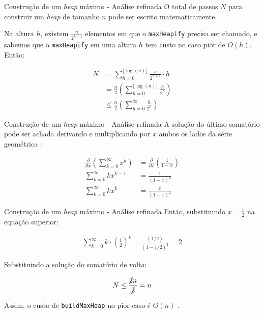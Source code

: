 \documentclass[t, 10pt]{beamer}
\begin{document}
  \begin{frame}{Construção de um \emph{heap} máximo - Análise refinada}
    O total de passos $N$ para construir um \emph{heap} de tamanho $n$
    pode ser escrito matematicamente.

    Na altura $h$, existem $\frac{n}{2 ^ {h + 1}}$ elementos em que o
    \texttt{maxHeapify} precisa ser chamado, e sabemos que o 
    \texttt{maxHeapify} em uma altura $h$ tem custo no caso pior
    de $O(h)$. Então:
    
    \vspace{-1em}
    \begin{align*}
      N &= \sum_{h = 0}^{\lfloor\log(n)\rfloor} \frac{n}{2 ^ {h + 1}} \cdot h \\
        &= \frac{n}{2} \left(\sum_{h = 0}^{\lfloor\log(n)\rfloor} \frac{h}{2 ^ h}\right) \\
        &\leq \frac{n}{2} \left(\sum_{h = 0}^{\infty} \frac{h}{2 ^ h}\right)
    \end{align*}
    
  \end{frame}

  \begin{frame}{Construção de um \emph{heap} máximo - Análise refinada}
    A solução do último somatório pode ser achada derivando e multiplicando
    por $x$ ambos os lados da série geométrica \footnotemark[1]:

    \begin{align*}
      \frac{\partial}{\partial x}\left(\sum_{k = 0}^{\infty} x ^ k\right)
      &= \frac{\partial}{\partial x}\left(\frac{1}{1 - x}\right) \\
      \sum_{k = 0}^{\infty} kx^{k - 1} &= \frac{1}{(1 - x) ^ 2} \\
      \sum_{k = 0}^{\infty} kx ^ k &= \frac{x}{(1 - x) ^ 2}
    \end{align*}

  \end{frame}

  \begin{frame}[c]{Construção de um \emph{heap} máximo - Análise refinada}
    Então, substituindo $x = \frac{1}{2}$ na equação superior:

    \begin{align*}
      \sum_{k = 0}^{\infty} k \cdot \left(\frac{1}{2}\right) ^ k =
      \frac{(1 / 2)}{(1 - 1 / 2) ^ 2} = 2
    \end{align*}

    Substituindo a solução do somatório de volta:

    $$N \leq \frac{\cancel{2}n}{\cancel{2}} = n$$

    Assim, o custo de \texttt{buildMaxHeap} no pior caso é $O(n)$ \footnotemark[1].

  \end{frame}
\end{document}
